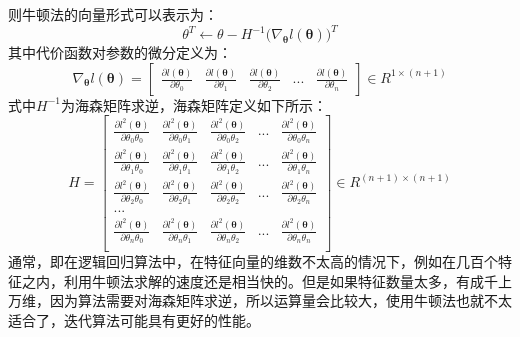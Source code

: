 \documentclass[UTF8]{article}
\begin{document}
则牛顿法的向量形式可以表示为：
\begin{equation}
\theta ^{T} \leftarrow \theta - H^{-1} \Big(\nabla _{\boldsymbol{\theta}} l(\boldsymbol{\theta}) \Big)^{T}
\label{lcrn-newton-vector-method}
\end{equation}
其中代价函数对参数的微分定义为：
\begin{equation}
\nabla _{\boldsymbol{\theta}} l(\boldsymbol{\theta}) = \begin{bmatrix}
\frac{\partial{l(\boldsymbol{\theta})}}{\partial{\theta _{0}}} & \frac{\partial{l(\boldsymbol{\theta})}}{\partial{\theta _{1}}} & \frac{\partial{l(\boldsymbol{\theta})}}{\partial{\theta _{2}}} & ... & \frac{\partial{l(\boldsymbol{\theta})}}{\partial{\theta _{n}}}
\end{bmatrix} \in R^{1 \times (n+1)}
\label{lcrn-loss-theta-gradient}
\end{equation}
式中$H^{-1}$为海森矩阵求逆，海森矩阵定义如下所示：
\begin{equation}
H = \begin{bmatrix}
\frac{\partial{l^{2}(\boldsymbol{\theta})}}{\partial{\theta _{0}\theta _{0}}} & \frac{\partial{l^{2}(\boldsymbol{\theta})}}{\partial{\theta _{0}\theta _{1}}} & \frac{\partial{l^{2}(\boldsymbol{\theta})}}{\partial{\theta _{0}\theta _{2}}} & ... & \frac{\partial{l^{2}(\boldsymbol{\theta})}}{\partial{\theta _{0}\theta _{n}}} \\
\frac{\partial{l^{2}(\boldsymbol{\theta})}}{\partial{\theta _{1}\theta _{0}}} & \frac{\partial{l^{2}(\boldsymbol{\theta})}}{\partial{\theta _{1}\theta _{1}}} & \frac{\partial{l^{2}(\boldsymbol{\theta})}}{\partial{\theta _{1}\theta _{2}}} & ... & \frac{\partial{l^{2}(\boldsymbol{\theta})}}{\partial{\theta _{1}\theta _{n}}} \\
\frac{\partial{l^{2}(\boldsymbol{\theta})}}{\partial{\theta _{2}\theta _{0}}} & \frac{\partial{l^{2}(\boldsymbol{\theta})}}{\partial{\theta _{2}\theta _{1}}} & \frac{\partial{l^{2}(\boldsymbol{\theta})}}{\partial{\theta _{2}\theta _{2}}} & ... & \frac{\partial{l^{2}(\boldsymbol{\theta})}}{\partial{\theta _{2}\theta _{n}}} \\
... \\
\frac{\partial{l^{2}(\boldsymbol{\theta})}}{\partial{\theta _{n}\theta _{0}}} & \frac{\partial{l^{2}(\boldsymbol{\theta})}}{\partial{\theta _{n}\theta _{1}}} & \frac{\partial{l^{2}(\boldsymbol{\theta})}}{\partial{\theta _{n}\theta _{2}}} & ... & \frac{\partial{l^{2}(\boldsymbol{\theta})}}{\partial{\theta _{n}\theta _{n}}} \\
\end{bmatrix} \in R^{(n+1) \times (n+1)}
\label{lcrn-hessian-matrix-def}
\end{equation}
通常，即在逻辑回归算法中，在特征向量的维数不太高的情况下，例如在几百个特征之内，利用牛顿法求解的速度还是相当快的。但是如果特征数量太多，有成千上万维，因为算法需要对海森矩阵求逆，所以运算量会比较大，使用牛顿法也就不太适合了，迭代算法可能具有更好的性能。
\end{document}
